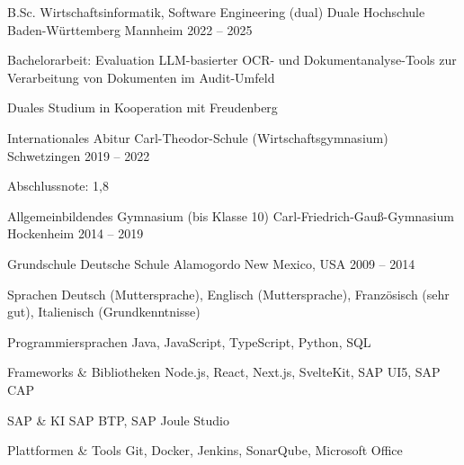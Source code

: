 \documentclass[11pt, a4paper]{awesome-cv}
\begin{document}

\begin{cventries}

\cventry
  {B.Sc. Wirtschaftsinformatik, Software Engineering (dual)}
  {Duale Hochschule Baden-Württemberg}
  {Mannheim}
  {2022 -- 2025}
  {
    \begin{cvitems}
      \item {Bachelorarbeit: Evaluation LLM-basierter OCR- und Dokumentanalyse-Tools zur Verarbeitung von Dokumenten im Audit-Umfeld}
      \item {Duales Studium in Kooperation mit Freudenberg}
    \end{cvitems}
  }

\cventry
  {Internationales Abitur}
  {Carl-Theodor-Schule (Wirtschaftsgymnasium)}
  {Schwetzingen}
  {2019 -- 2022}
  {
    \begin{cvitems}
      \item {Abschlussnote: 1,8}
    \end{cvitems}
  }

\cventry
  {Allgemeinbildendes Gymnasium (bis Klasse 10)}
  {Carl-Friedrich-Gauß-Gymnasium}
  {Hockenheim}
  {2014 -- 2019}
  {}

\cventry
  {Grundschule}
  {Deutsche Schule Alamogordo}
  {New Mexico, USA}
  {2009 -- 2014}
  {}

\end{cventries}


\begin{cvskills}

\cvskill
{Sprachen}
{Deutsch (Muttersprache), Englisch (Muttersprache), Französisch (sehr gut), Italienisch (Grundkenntnisse)}

\cvskill
{Programmiersprachen}
{Java, JavaScript, TypeScript, Python, SQL}

\cvskill
{Frameworks \& Bibliotheken}
{Node.js, React, Next.js, SvelteKit, SAP UI5, SAP CAP}

\cvskill
{SAP \& KI}
{SAP BTP, SAP Joule Studio}

\cvskill
{Plattformen \& Tools}
{Git, Docker, Jenkins, SonarQube, Microsoft Office}

\end{cvskills}


\begin{cvskills}


\end{cvskills}
\end{document}
